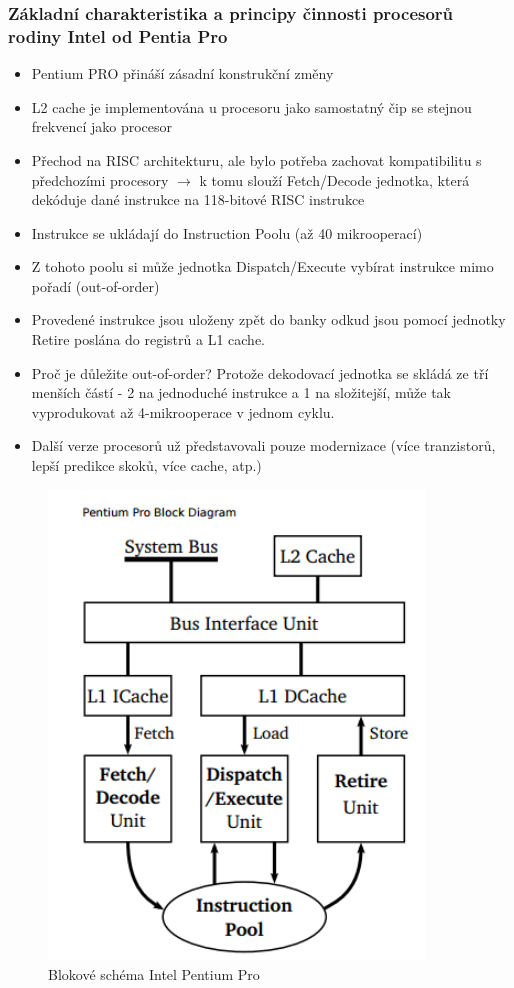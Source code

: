 \documentclass[10pt,a4paper]{article}
\begin{document}
\subsubsection{Základní charakteristika a principy činnosti procesorů rodiny Intel od Pentia Pro}
\begin{itemize}
\item Pentium PRO přináší zásadní konstrukční změny
\item L2 cache je implementována u procesoru jako samostatný čip se stejnou frekvencí jako procesor
\item Přechod na RISC architekturu, ale bylo potřeba zachovat kompatibilitu s předchozími procesory $\rightarrow$ k tomu slouží Fetch/Decode jednotka, která dekóduje dané instrukce na 118-bitové RISC instrukce
\item Instrukce se ukládají do Instruction Poolu (až 40 mikrooperací)
\item Z tohoto poolu si může jednotka Dispatch/Execute vybírat instrukce mimo pořadí (out-of-order)
\item Provedené instrukce jsou uloženy zpět do banky odkud jsou pomocí jednotky Retire poslána do registrů a L1 cache.
\item Proč je důležite out-of-order? Protože dekodovací jednotka se skládá ze tří menších částí - 2 na jednoduché instrukce a 1 na složitejší, může tak vyprodukovat až 4-mikrooperace v jednom cyklu.
\item Další verze procesorů už představovali pouze modernizace (více tranzistorů, lepší predikce skoků, více cache, atp.)
\end{itemize}
\begin{figure}[ht]
    \centering
    \includegraphics[width=10cm]{ppro.png}
    \caption{Blokové schéma Intel Pentium Pro}
    \label{fig:ppro}
\end{figure}
\newpage
\end{document}

